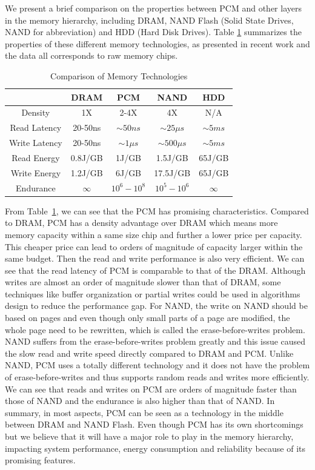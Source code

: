 We present a brief comparison on the properties
between PCM and other layers in the memory hierarchy,
including DRAM, NAND Flash (Solid State Drives, NAND for abbreviation)
and HDD (Hard Disk Drives).
Table \ref{tab:comparison} summarizes
the properties of these different memory technologies, as presented in recent
work \cite{chen2011rethinking, qureshi2009scalable, bedeschi2008multi} and the data all corresponds to raw memory chips.

\begin{table}\vspace*{-1em}
\centering \caption{Comparison of Memory Technologies}
\hspace*{-1em}\begin{tabular}{|c|c|c|c|c|} \hline
&DRAM&PCM&NAND&HDD \\ \hline \hline
Density&1X&2-4X&4X&N/A  \\ \hline
Read Latency&20-50ns&$\sim50ns$&$\sim25\mu s$&$\sim5ms$  \\
Write Latency&20-50ns&$\sim1\mu s$&$\sim500\mu s$&$\sim5ms$  \\ \hline
Read Energy&0.8J/GB&1J/GB&1.5J/GB&65J/GB  \\
Write Energy&1.2J/GB&6J/GB&17.5J/GB&65J/GB  \\ \hline
Endurance&$\infty$&$10^6-10^8$&$10^5-10^6$&$\infty$  \\ \hline
\end{tabular}
\label{tab:comparison}
\end{table}

From Table~\ref{tab:comparison},
we can see that the PCM has promising characteristics.
Compared to DRAM,
PCM has a density advantage over DRAM which means more memory capacity within
a same size chip and further a lower price per capacity.
This cheaper price can lead to orders of magnitude of capacity larger within the same budget.
Then the read and write performance is also very efficient. We can see that the read latency of PCM
is comparable to that of the DRAM.
Although writes are almost an order of magnitude slower than that of DRAM,
some techniques like buffer organization or partial writes could be used in
algorithms design to reduce the performance gap.
For NAND, the write on NAND should be based on pages and even though only
small parts of a page are modified, the whole page need to be rewritten, which is called the erase-before-writes problem.
NAND suffers from the erase-before-writes problem greatly and this issue caused the slow read and write speed
directly compared to DRAM and PCM.
Unlike NAND, PCM uses a totally different technology and it does not have the problem of erase-before-writes and
thus supports random reads and writes more efficiently.
We can see that reads and writes on PCM are
orders of magnitude faster than those of NAND and the endurance is also higher than that of NAND.
In summary, in most aspects, PCM can be seen as a technology in the middle between DRAM and NAND Flash.
Even though PCM has its own shortcomings but we believe that it will have a major role to play
in the memory hierarchy, impacting system performance, energy consumption and reliability because of its promising features.

